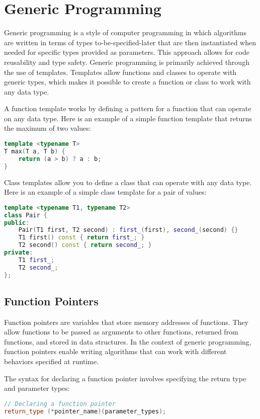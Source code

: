 \section{Generic Programming}

Generic programming is a style of computer programming in which
algorithms are written in terms of types to-be-specified-later
that are then instantiated when needed for specific types provided
as parameters. This approach allows for code reusability and type safety.
Generic programming is primarily achieved through the use of templates.
Templates allow functions and classes to operate with generic types,
which makes it possible to create a function or class to work with
any data type.

A function template works by defining a pattern for a function that can
operate on any data type. Here is an example of a simple function template
that returns the maximum of two values:

\begin{lstlisting}[language=C++]
template <typename T>
T max(T a, T b) {
    return (a > b) ? a : b;
}
\end{lstlisting}
Class templates allow you to define a class that can operate with
any data type. Here is an example of a simple class template for a
pair of values:

\begin{lstlisting}[language=C++]
template <typename T1, typename T2>
class Pair {
public:
    Pair(T1 first, T2 second) : first_(first), second_(second) {}
    T1 first() const { return first_; }
    T2 second() const { return second_; }
private:
    T1 first_;
    T2 second_;
};
\end{lstlisting}

\subsection{Function Pointers}

Function pointers are variables that store memory addresses of functions. They allow functions to be passed as arguments to other functions, returned from functions, and stored in data structures. In the context of generic programming, function pointers enable writing algorithms that can work with different behaviors specified at runtime.

The syntax for declaring a function pointer involves specifying the return type and parameter types:

\begin{lstlisting}[language=C++]
// Declaring a function pointer
return_type (*pointer_name)(parameter_types);
\end{lstlisting}

